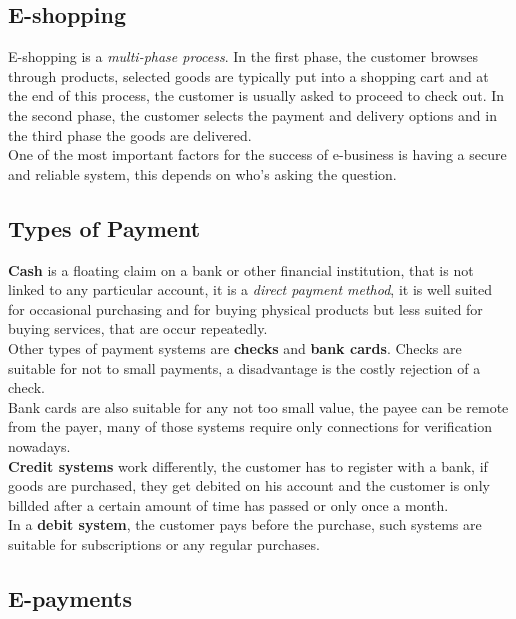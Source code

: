 \documentclass[a4paper, 10 pt, conference]{ieeeconf}
\begin{document}
\subsection{\textbf{E-shopping}}
E-shopping is a \emph{multi-phase process}. In the first phase, the customer browses through products, selected goods are typically put into a shopping cart and at the end of this process, the customer is usually asked to proceed to check out. 
In the second phase, the customer selects the payment and delivery options and in the third phase the goods are delivered. \\
One of the most important factors for the success of e-business is having a secure and reliable system, this depends on who's asking the question. 

\subsection{\textbf{Types of Payment}}
\textbf{Cash} is a floating claim on a bank or other financial institution, that is not linked to any particular account, it is a \emph{direct payment method}, it is well suited for occasional purchasing and for buying physical products but less suited for buying services, that are occur repeatedly. \\
Other types of payment systems are \textbf{checks} and \textbf{bank cards}. Checks are suitable for not to small payments, a disadvantage is the costly rejection of a check. \\
Bank cards are also suitable for any not too small value, the payee can be remote from the payer, many of those systems require only connections for verification nowadays. \\
\textbf{Credit systems} work differently, the customer has to register with a bank, if goods are purchased, they get debited on his account and the customer is only billded after a certain amount of time has passed or only once a month. \\
In a \textbf{debit system}, the customer pays before the purchase, such systems are suitable for subscriptions or any regular purchases. 

\subsection{\textbf{E-payments}}
\end{document}

